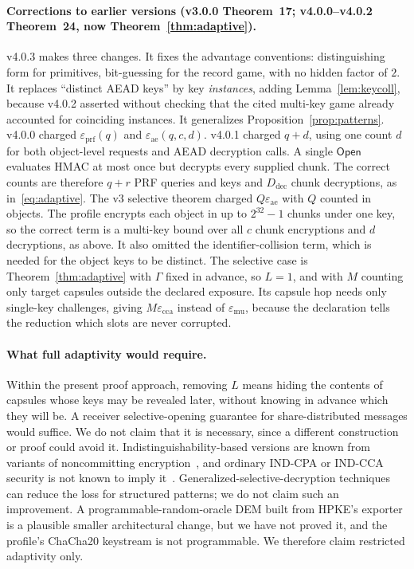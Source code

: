 \documentclass[pdflatex,sn-mathphys-num,twocolumn]{sn-jnl}
\theoremstyle{plain}
\theoremstyle{definition}
\begin{document}
\paragraph{Corrections to earlier versions (v3.0.0 Theorem~17; v4.0.0--v4.0.2 Theorem~24, now Theorem~\ref{thm:adaptive}).}
v4.0.3 makes three changes. It fixes the advantage conventions: distinguishing form for primitives, bit-guessing for the record game, with no hidden factor of $2$. It replaces ``distinct AEAD keys'' by key \emph{instances}, adding Lemma~\ref{lem:keycoll}, because v4.0.2 asserted without checking that the cited multi-key game already accounted for coinciding instances. It generalizes Proposition~\ref{prop:patterns}. v4.0.0 charged $\varepsilon_{\mathrm{prf}}(q)$ and $\varepsilon_{\mathrm{ae}}(q,c,d)$. v4.0.1 charged $q+d$, using one count $d$ for both object-level requests and AEAD decryption calls. A single $\mathsf{Open}$ evaluates HMAC at most once but decrypts every supplied chunk. The correct counts are therefore $q+r$ PRF queries and keys and $D_{\mathrm{dec}}$ chunk decryptions, as in~\eqref{eq:adaptive}. The v3 selective theorem charged $Q\varepsilon_{\mathrm{ae}}$ with $Q$ counted in objects. The profile encrypts each object in up to $2^{32}-1$ chunks under one key, so the correct term is a multi-key bound over all $c$ chunk encryptions and $d$ decryptions, as above. It also omitted the identifier-collision term, which is needed for the object keys to be distinct. The selective case is Theorem~\ref{thm:adaptive} with $\Gamma$ fixed in advance, so $L=1$, and with $M$ counting only target capsules outside the declared exposure. Its capsule hop needs only single-key challenges, giving $M\varepsilon_{\mathrm{cca}}$ instead of $\varepsilon_{\mathrm{mu}}$, because the declaration tells the reduction which slots are never corrupted.

\paragraph{What full adaptivity would require.}
Within the present proof approach, removing $L$ means hiding the contents of capsules whose keys may be revealed later, without knowing in advance which they will be. A receiver selective-opening guarantee for share-distributed messages would suffice. We do not claim that it is necessary, since a different construction or proof could avoid it. Indistinguishability-based versions are known from variants of noncommitting encryption~\cite{hazay2015,canetti1996}, and ordinary IND-CPA or IND-CCA security is not known to imply it~\cite{bellare2009}. Generalized-selective-decryption techniques~\cite{panjwani2007,jafargholi2017} can reduce the loss for structured patterns; we do not claim such an improvement. A programmable-random-oracle DEM built from HPKE's exporter is a plausible smaller architectural change, but we have not proved it, and the profile's ChaCha20 keystream is not programmable. We therefore claim restricted adaptivity only.
\end{document}
